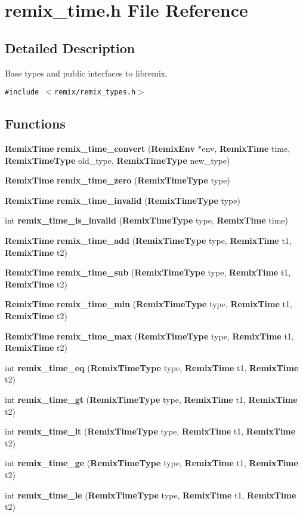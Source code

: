 \section{remix\_\-time.h File Reference}
\label{remix__time_8h}


\subsection{Detailed Description}
Base types and public interfaces to libremix. 



{\tt \#include $<$remix/remix\_\-types.h$>$}\par
\subsection*{Functions}
\begin{CompactItemize}
\item 
{\bf Remix\-Time} {\bf remix\_\-time\_\-convert} ({\bf Remix\-Env} $\ast$env, {\bf Remix\-Time} time, {\bf Remix\-Time\-Type} old\_\-type, {\bf Remix\-Time\-Type} new\_\-type)
\item 
{\bf Remix\-Time} {\bf remix\_\-time\_\-zero} ({\bf Remix\-Time\-Type} type)
\item 
{\bf Remix\-Time} {\bf remix\_\-time\_\-invalid} ({\bf Remix\-Time\-Type} type)
\item 
int {\bf remix\_\-time\_\-is\_\-invalid} ({\bf Remix\-Time\-Type} type, {\bf Remix\-Time} time)
\item 
{\bf Remix\-Time} {\bf remix\_\-time\_\-add} ({\bf Remix\-Time\-Type} type, {\bf Remix\-Time} t1, {\bf Remix\-Time} t2)
\item 
{\bf Remix\-Time} {\bf remix\_\-time\_\-sub} ({\bf Remix\-Time\-Type} type, {\bf Remix\-Time} t1, {\bf Remix\-Time} t2)
\item 
{\bf Remix\-Time} {\bf remix\_\-time\_\-min} ({\bf Remix\-Time\-Type} type, {\bf Remix\-Time} t1, {\bf Remix\-Time} t2)
\item 
{\bf Remix\-Time} {\bf remix\_\-time\_\-max} ({\bf Remix\-Time\-Type} type, {\bf Remix\-Time} t1, {\bf Remix\-Time} t2)
\item 
int {\bf remix\_\-time\_\-eq} ({\bf Remix\-Time\-Type} type, {\bf Remix\-Time} t1, {\bf Remix\-Time} t2)
\item 
int {\bf remix\_\-time\_\-gt} ({\bf Remix\-Time\-Type} type, {\bf Remix\-Time} t1, {\bf Remix\-Time} t2)
\item 
int {\bf remix\_\-time\_\-lt} ({\bf Remix\-Time\-Type} type, {\bf Remix\-Time} t1, {\bf Remix\-Time} t2)
\item 
int {\bf remix\_\-time\_\-ge} ({\bf Remix\-Time\-Type} type, {\bf Remix\-Time} t1, {\bf Remix\-Time} t2)
\item 
int {\bf remix\_\-time\_\-le} ({\bf Remix\-Time\-Type} type, {\bf Remix\-Time} t1, {\bf Remix\-Time} t2)
\end{CompactItemize}


